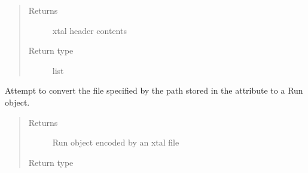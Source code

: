 \documentclass[letterpaper,10pt,english]{sphinxmanual}
\begin{document}
\begin{fulllineitems}
\begin{fulllineitems}
\begin{quote}
\begin{description}
\item[{Returns}] \leavevmode
xtal header contents

\item[{Return type}] \leavevmode
list

\end{description}\end{quote}

\end{fulllineitems}


\begin{fulllineitems}
\label{\detokenize{polo.utils:polo.utils.io_utils.RunDeserializer.xtal_to_run}}
Attempt to convert the file specified by the path stored in the
 attribute to a Run object.
\begin{quote}\begin{description}
\item[{Returns}] \leavevmode
Run object encoded by an xtal file

\item[{Return type}] \leavevmode
{\hyperref[\detokenize{polo.crystallography:polo.crystallography.run.Run}]{}}

\end{description}\end{quote}

\end{fulllineitems}


\end{fulllineitems}

\end{document}
